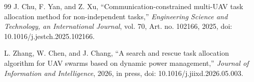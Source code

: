 \begin{thebibliography}{99}
	J. Chu, F. Yan, and Z. Xu,
	``Communication-constrained multi-UAV task allocation method for non-independent tasks,''
	\emph{Engineering Science and Technology, an International Journal}, vol. 70, Art. no. 102166, 2025,
	doi: 10.1016/j.jestch.2025.102166.
	
	L. Zhang, W. Chen, and J. Chang,
	``A search and rescue task allocation algorithm for UAV swarms based on dynamic power management,''
	\emph{Journal of Information and Intelligence}, 2026, in press,
	doi: 10.1016/j.jiixd.2026.05.003.
		
	
\end{thebibliography}